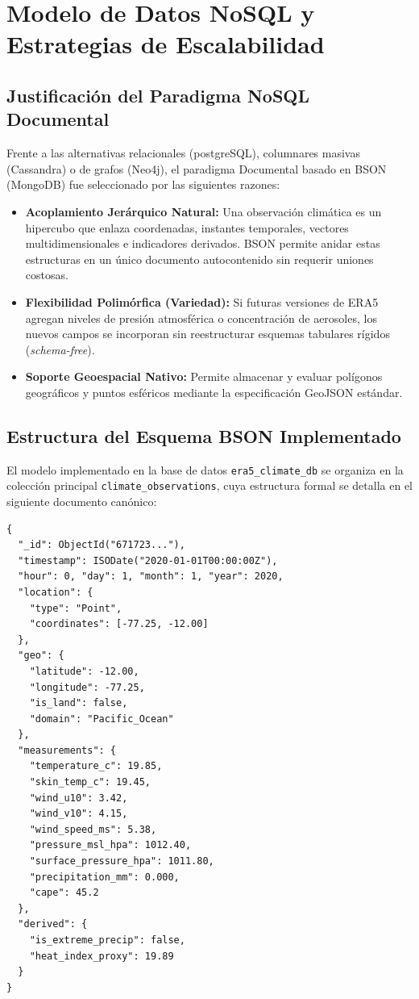 \documentclass[conference]{IEEEtran}
\begin{document}
\section{Modelo de Datos NoSQL y Estrategias de Escalabilidad}

\subsection{Justificación del Paradigma NoSQL Documental}
Frente a las alternativas relacionales (postgreSQL), columnares masivas (Cassandra) o de grafos (Neo4j), el paradigma Documental basado en BSON (MongoDB) fue seleccionado por las siguientes razones:
\begin{itemize}
    \item \textbf{Acoplamiento Jerárquico Natural:} Una observación climática es un hipercubo que enlaza coordenadas, instantes temporales, vectores multidimensionales e indicadores derivados. BSON permite anidar estas estructuras en un único documento autocontenido sin requerir uniones costosas.
    \item \textbf{Flexibilidad Polimórfica (Variedad):} Si futuras versiones de ERA5 agregan niveles de presión atmosférica o concentración de aerosoles, los nuevos campos se incorporan sin reestructurar esquemas tabulares rígidos (\textit{schema-free}).
    \item \textbf{Soporte Geoespacial Nativo:} Permite almacenar y evaluar polígonos geográficos y puntos esféricos mediante la especificación GeoJSON estándar.
\end{itemize}

\subsection{Estructura del Esquema BSON Implementado}
El modelo implementado en la base de datos \texttt{era5\_climate\_db} se organiza en la colección principal \texttt{climate\_observations}, cuya estructura formal se detalla en el siguiente documento canónico:

\begin{scriptsize}
\begin{verbatim}
{
  "_id": ObjectId("671723..."),
  "timestamp": ISODate("2020-01-01T00:00:00Z"),
  "hour": 0, "day": 1, "month": 1, "year": 2020,
  "location": {
    "type": "Point",
    "coordinates": [-77.25, -12.00]
  },
  "geo": {
    "latitude": -12.00,
    "longitude": -77.25,
    "is_land": false,
    "domain": "Pacific_Ocean"
  },
  "measurements": {
    "temperature_c": 19.85,
    "skin_temp_c": 19.45,
    "wind_u10": 3.42,
    "wind_v10": 4.15,
    "wind_speed_ms": 5.38,
    "pressure_msl_hpa": 1012.40,
    "surface_pressure_hpa": 1011.80,
    "precipitation_mm": 0.000,
    "cape": 45.2
  },
  "derived": {
    "is_extreme_precip": false,
    "heat_index_proxy": 19.89
  }
}
\end{verbatim}
\end{scriptsize}
\end{document}
